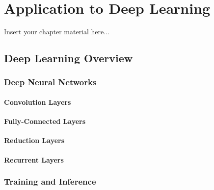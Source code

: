 
\chapter{Application to Deep Learning}
\label{chapter:results}

Insert your chapter material here...


\section{Deep Learning Overview}
\label{section:problem}

\subsection{Deep Neural Networks}
\subsubsection{Convolution Layers}
\subsubsection{Fully-Connected Layers}
\subsubsection{Reduction Layers}
\subsubsection{Recurrent Layers}

\subsection{Training and Inference}

